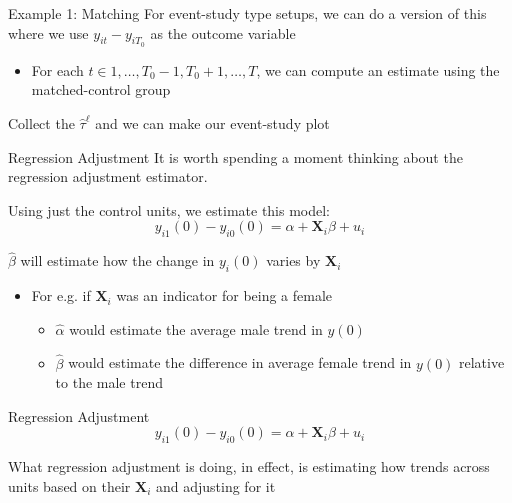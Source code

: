 \documentclass[aspectratio=169,t,11pt,table]{beamer}
\begin{document}
\begin{frame}{Example 1: Matching}
  For event-study type setups, we can do a version of this where
  we use $y_{it} - y_{iT_0}$ as the outcome variable
  \begin{itemize}
    \item For each $t \in 1, \dots, T_0 - 1, T_0 + 1, \dots, T$, we can compute an estimate using the matched-control group 
  \end{itemize}

  \bigskip
  Collect the $\hat{\tau}^\ell$ and we can make our event-study plot
\end{frame}

\begin{frame}{Regression Adjustment}
  It is worth spending a moment thinking about the regression adjustment estimator. 
  
  Using just the control units, we estimate this model:
  $$
    y_{i1}(0) - y_{i0}(0) = \alpha + \bm{X}_i \beta + u_i
  $$

  \pause
  \bigskip
  $\hat{\beta}$ will estimate how the change in $y_i(0)$ varies by $\bm{X}_i$
  \begin{itemize}
    \item For e.g. if $\bm{X}_i$ was an indicator for being a female
    \begin{itemize}
      \item $\hat{\alpha}$ would estimate the average male trend in $y(0)$
      
      \item $\hat{\beta}$ would estimate the difference in average female trend in $y(0)$ relative to the male trend 
    \end{itemize}
  \end{itemize}
\end{frame}

\begin{frame}{Regression Adjustment}
  \vspace*{-\bigskipamount}
  $$
    y_{i1}(0) - y_{i0}(0) = \alpha + \bm{X}_i \beta + u_i
  $$
  
  What regression adjustment is doing, in effect, is estimating how trends across units based on their $\bm{X}_i$ and adjusting for it
\end{frame}
\end{document}
